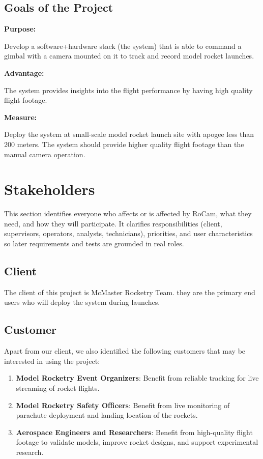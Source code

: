 \documentclass[12pt]{article}
\begin{document}
\subsection{Goals of the Project}

\textbf{Purpose:}

Develop a software+hardware stack (the system) that is able to command a gimbal
with a camera mounted on it to track and record model rocket launches.

\textbf{Advantage:}

The system provides insights into the flight performance by having high quality
flight footage.

\textbf{Measure:}

Deploy the system at small-scale model rocket launch site with apogee less than
200 meters. The system should provide higher quality flight footage than the
manual camera operation.

\section{Stakeholders}
This section identifies everyone who affects or is affected by RoCam, what they need, and how they will participate.
It clarifies responsibilities (client, supervisors, operators, analysts, technicians), priorities, and user characteristics so later requirements and tests are grounded in real roles.

\subsection{Client}

The client of this project is McMaster Rocketry Team. they are the primary end
users who will deploy the system during launches.

\subsection{Customer}

Apart from our client, we also identified the following customers that may be
interested in using the project:

\begin{enumerate}
  \item \textbf{Model Rocketry Event Organizers}: Benefit from
        reliable tracking for live streaming of rocket flights.
  \item \textbf{Model Rocketry Safety Officers}: Benefit from
        live monitoring of parachute deployment and landing location
        of the rockets.
  \item \textbf{Aerospace Engineers and Researchers}: Benefit from
        high-quality flight footage to validate models, improve rocket
        designs, and support experimental research.
\end{enumerate}
\end{document}
